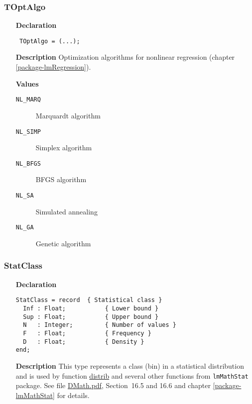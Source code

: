 \documentclass[12pt,a4paper,oneside]{report}
\newcommand{\declarationitem}[1]{\textbf{#1}}
\newcommand{\descriptiontitle}[1]{\textbf{#1}}
\newcommand{\code}[1]{\texttt{#1}}
\begin{document}
\subsubsection{TOptAlgo}
\label{utypes-TOptAlgo}
\begin{itemize}\item[\declarationitem{Declaration}\hfill]
	\begin{flushleft}
		\code{
			TOptAlgo = (...);}
		
	\end{flushleft}
	
	\par
	\item[\descriptiontitle{Description}]
	Optimization algorithms for nonlinear regression (chapter \ref{package-lmRegression}).
		\item[\textbf{Values}]
	\begin{description}
		\item[\texttt{NL{\_}MARQ}] Marquardt algorithm
		\item[\texttt{NL{\_}SIMP}] Simplex algorithm
		\item[\texttt{NL{\_}BFGS}] BFGS algorithm
		\item[\texttt{NL{\_}SA}] Simulated annealing
		\item[\texttt{NL{\_}GA}] Genetic algorithm
	\end{description}
\end{itemize}

\subsubsection{StatClass}\label{sec:statclass}
\begin{itemize}
	\item[\declarationitem{Declaration}\hfill]
	\begin{verbatim}
StatClass = record  { Statistical class }
  Inf : Float;           { Lower bound }
  Sup : Float;           { Upper bound }
  N   : Integer;         { Number of values }
  F   : Float;           { Frequency }
  D   : Float;           { Density }
end;
	\end{verbatim}
	\item[\descriptiontitle{Description}]
This type represents a class (bin) in a statistical distribution and is used by function \hyperref[udistrib]{distrib} and several other functions from \code{lmMathStat} package. See file \href{DMath.pdf}{DMath.pdf}, Section~16.5 and 16.6 and chapter \ref{package-lmMathStat} for details. 
\end{itemize}
\end{document}
